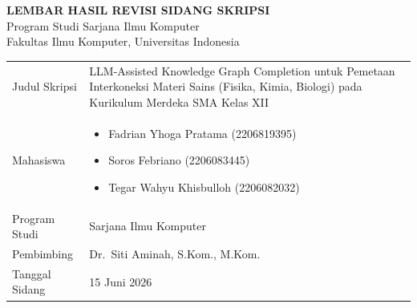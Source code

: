 \documentclass[12pt, a4paper]{article}
\begin{document}
\begin{center}
  {\large\bfseries LEMBAR HASIL REVISI SIDANG SKRIPSI}\\[2pt]
  {\normalsize Program Studi Sarjana Ilmu Komputer\\
  Fakultas Ilmu Komputer, Universitas Indonesia}
\end{center}
\vspace{0.4cm}

\noindent\begin{tabular}{@{}p{3.2cm}@{ : }p{\dimexpr\linewidth-3.8cm}@{}}
Judul Skripsi &
LLM-Assisted Knowledge Graph Completion untuk Pemetaan Interkoneksi Materi
Sains (Fisika, Kimia, Biologi) pada Kurikulum Merdeka SMA Kelas XII \\[6pt]
Mahasiswa &
\begin{itemize}[topsep=0pt, partopsep=0pt, parsep=0pt, itemsep=2pt,
                leftmargin=1.4em]
  \item Fadrian Yhoga Pratama (2206819395)
  \item Soros Febriano (2206083445)
  \item Tegar Wahyu Khisbulloh (2206082032)
\end{itemize} \\[6pt]
Program Studi & Sarjana Ilmu Komputer \\[6pt]
Pembimbing & Dr.\ Siti Aminah, S.Kom., M.Kom. \\[6pt]
Tanggal Sidang & 15 Juni 2026 \\
\end{tabular}

\vspace{0.5cm}
\end{document}
